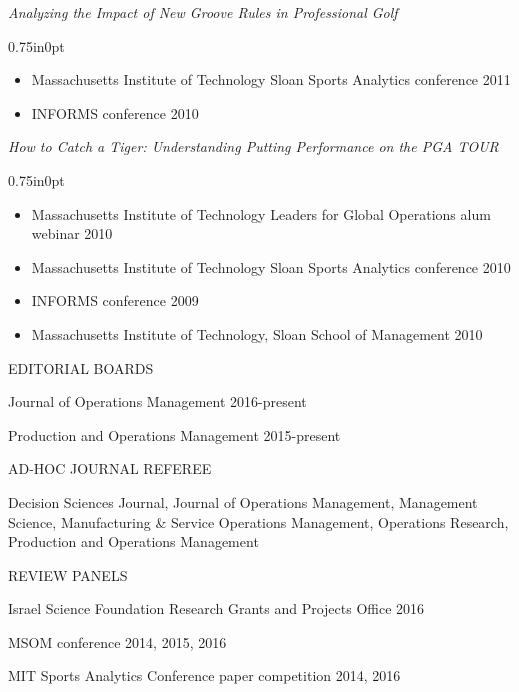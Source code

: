 \documentclass[letterpaper,11pt,oneside]{article}
\newcommand\myIndent{0.75in}
\newcommand\myParSkip{3pt}
\newcommand\myHangIndent{1in}
\newcommand\mySpaceBeforeSection{0.9em}
\newcommand{\NiceIndent}{ \parindent=\myIndent \hangindent=\myHangIndent }
\newenvironment{miniListBullet}
    {
        \begin{adjustwidth}{\myIndent}{0pt}
        \setlength{\parskip}{0pt}%
        \renewcommand\labelitemi{{\boldmath$\cdot$}}
        \begin{itemize}
        \setlength\itemsep{0em}
    }
    {
        \end{itemize}
        \setlength{\parskip}{\myParSkip}%
        \end{adjustwidth}
    }
\begin{document}
\NiceIndent \textit{Analyzing the Impact of New Groove Rules in Professional Golf}
\begin{miniListBullet}
    \item Massachusetts Institute of Technology Sloan Sports Analytics conference 2011
    \item INFORMS conference 2010
\end{miniListBullet}



\NiceIndent \textit{How to Catch a Tiger: Understanding Putting Performance on the PGA TOUR}
\begin{miniListBullet}
    \item Massachusetts Institute of Technology Leaders for Global Operations alum webinar 2010
    \item Massachusetts Institute of Technology Sloan Sports Analytics conference 2010
    \item INFORMS conference 2009
    \item Massachusetts Institute of Technology, Sloan School of Management 2010
\end{miniListBullet}



\vspace{\mySpaceBeforeSection}
\noindent EDITORIAL BOARDS

\NiceIndent Journal of Operations Management 2016-present

\NiceIndent Production and Operations Management 2015-present


\vspace{\mySpaceBeforeSection}
\noindent AD-HOC JOURNAL REFEREE

\NiceIndent Decision Sciences Journal, Journal of Operations Management, Management Science, Manufacturing \& Service Operations Management, Operations Research, Production and Operations Management

\vspace{\mySpaceBeforeSection}
\noindent REVIEW PANELS


\NiceIndent Israel Science Foundation Research Grants and Projects Office 2016

\NiceIndent MSOM conference 2014, 2015, 2016

\NiceIndent MIT Sports Analytics Conference paper competition 2014, 2016
\end{document}
